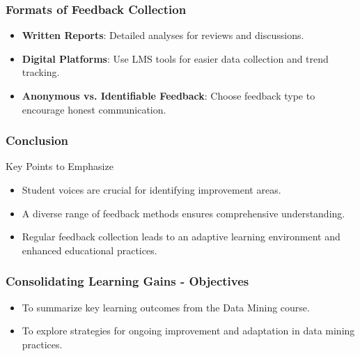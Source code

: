 \documentclass{beamer}
\begin{document}
\begin{frame}[fragile]
    \frametitle{Formats of Feedback Collection}
    \begin{itemize}
        \item \textbf{Written Reports}: Detailed analyses for reviews and discussions.
        \item \textbf{Digital Platforms}: Use LMS tools for easier data collection and trend tracking.
        \item \textbf{Anonymous vs. Identifiable Feedback}: Choose feedback type to encourage honest communication.
    \end{itemize}
\end{frame}

\begin{frame}[fragile]
    \frametitle{Conclusion}
    \begin{block}{Key Points to Emphasize}
        \begin{itemize}
            \item Student voices are crucial for identifying improvement areas.
            \item A diverse range of feedback methods ensures comprehensive understanding.
            \item Regular feedback collection leads to an adaptive learning environment and enhanced educational practices.
        \end{itemize}
    \end{block}
\end{frame}

\begin{frame}[fragile]
    \frametitle{Consolidating Learning Gains - Objectives}
    \begin{itemize}
        \item To summarize key learning outcomes from the Data Mining course.
        \item To explore strategies for ongoing improvement and adaptation in data mining practices.
    \end{itemize}
\end{frame}
\end{document}
